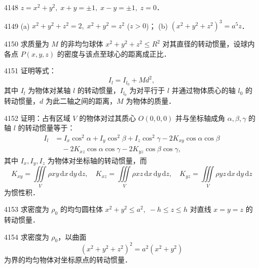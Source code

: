 
\begin{prob}[S]{4148}
$z = x^2 + y^2,\; x + y = \pm 1,\; x - y = \pm 1,\; z = 0$．
\end{prob}

\begin{prob}[M]{4149}
(a) $x^2 + y^2 + z^2 = 2,\; x^2 + y^2 = z^2$ ($z > 0$)；\qquad
(b) $(x^2 + y^2 + z^2)^3 = a^5 z$．
\end{prob}

\begin{prob}[M]{4150}
求质量为 $M$ 的非均匀球体 $x^2 + y^2 + z^2 \leqslant R^2$ 对其直径的转动惯量，设球内各点 $P(x,y,z)$ 的密度与该点至球心的距离成正比．
\end{prob}

\begin{prob}[M]{4151}
证明等式：
\[
I_l = I_{l_0} + Md^2,
\]
其中 $I_l$ 为物体对某轴 $l$ 的转动惯量，$I_{l_0}$ 为对平行于 $l$ 并通过物体质心的轴 $l_0$ 的转动惯量，$d$ 为此二轴之间的距离，$M$ 为物体的质量．
\end{prob}

\begin{prob}[L]{4152}
证明：占有区域 $V$ 的物体对过其质心 $O(0,0,0)$ 并与坐标轴成角 $\alpha, \beta, \gamma$ 的轴 $l$ 的转动惯量等于：
\[
\begin{aligned}
I_l &= I_x \cos^2\alpha + I_y \cos^2\beta + I_z \cos^2\gamma - 2K_{xy} \cos\alpha \cos\beta \\
&\quad - 2K_{xz} \cos\alpha \cos\gamma - 2K_{yz} \cos\beta \cos\gamma,
\end{aligned}
\]
其中 $I_x, I_y, I_z$ 为物体对坐标轴的转动惯量，而
\[
K_{xy} = \iiint\limits_V \rho xy \,\mathrm{d}x\,\mathrm{d}y\,\mathrm{d}z, \quad
K_{xz} = \iiint\limits_V \rho xz \,\mathrm{d}x\,\mathrm{d}y\,\mathrm{d}z, \quad
K_{yz} = \iiint\limits_V \rho yz \,\mathrm{d}x\,\mathrm{d}y\,\mathrm{d}z
\]
为惯性积．
\end{prob}

\begin{prob}[M]{4153}
求密度为 $\rho_0$ 的均匀圆柱体 $x^2 + y^2 \leqslant a^2,\; -h \leqslant z \leqslant h$ 对直线 $x = y = z$ 的转动惯量．
\end{prob}

\begin{prob}[M]{4154}
求密度为 $\rho_0$，以曲面
\[
(x^2 + y^2 + z^2)^2 = a^2(x^2 + y^2)
\]
为界的均匀物体对坐标原点的转动惯量．
\end{prob}

